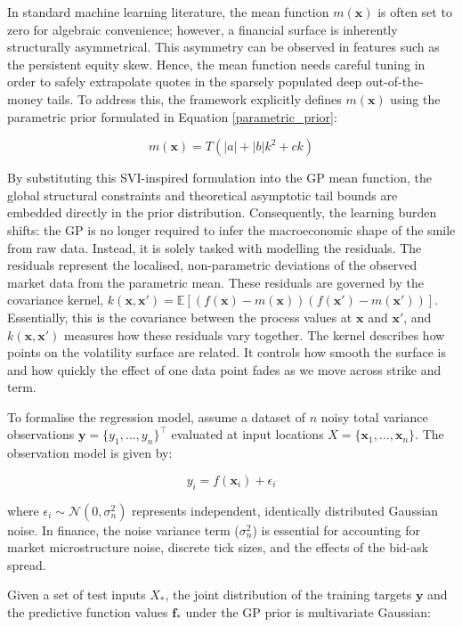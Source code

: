 \documentclass[12pt,oneside]{report}
\theoremstyle{definition}
\theoremstyle{remark}
\begin{document}
In standard machine learning literature, the mean function $m(\mathbf{x})$ is often set to zero for algebraic convenience; however, a financial surface is inherently structurally asymmetrical. This asymmetry can be observed in features such as the persistent equity skew. Hence, the mean function needs careful tuning in order to safely extrapolate quotes in the sparsely populated deep out-of-the-money tails. To address this, the framework explicitly defines $m(\mathbf{x})$ using the parametric prior formulated in Equation \ref{parametric_prior}:

$$m(\mathbf{x}) = T(|a| + |b|k^2 + c k)$$

By substituting this SVI-inspired formulation into the GP mean function, the global structural constraints and theoretical asymptotic tail bounds are embedded directly in the prior distribution. Consequently, the learning burden shifts: the GP is no longer required to infer the macroeconomic shape of the smile from raw data. Instead, it is solely tasked with modelling the residuals. The residuals represent the localised, non-parametric deviations of the observed market data from the parametric mean. These residuals are governed by the covariance kernel, $k(\mathbf{x}, \mathbf{x}') = \mathbb{E}[(f(\mathbf{x}) - m(\mathbf{x}))(f(\mathbf{x}') - m(\mathbf{x}'))]$. Essentially, this is the covariance between the process values at $\mathbf{x}$ and $\mathbf{x'}$, and $k(\mathbf{x}, \mathbf{x'})$ measures how these residuals vary together. The kernel describes how points on the volatility surface are related. It controls how smooth the surface is and how quickly the effect of one data point fades as we move across strike and term.

To formalise the regression model, assume a dataset of $n$ noisy total variance observations $\mathbf{y} = \{y_1, \dots, y_n\}^{\top}$ evaluated at input locations $X = \{\mathbf{x}_1, \dots, \mathbf{x}_n\}$. The observation model is given by:

\[y_i = f(\mathbf{x}_i) + \epsilon_i\]

where $\epsilon_i \sim \mathcal{N}(0, \sigma_n^2)$ represents independent, identically distributed Gaussian noise. In finance, the noise variance term ($\sigma_n^2$) is essential for accounting for market microstructure noise, discrete tick sizes, and the effects of the bid-ask spread.

Given a set of test inputs $X_*$, the joint distribution of the training targets $\mathbf{y}$ and the predictive function values $\mathbf{f}_*$ under the GP prior is multivariate Gaussian:
\end{document}
